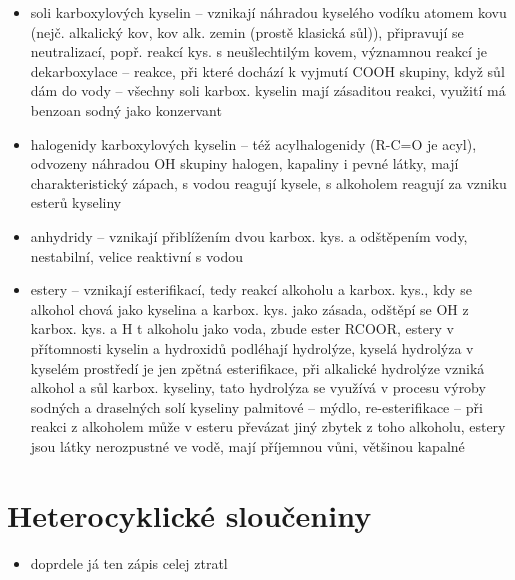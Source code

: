 \documentclass{article}
\begin{document}
\begin{itemize}
  \begin{itemize}
    \item soli karboxylových kyselin -- vznikají náhradou kyselého vodíku atomem kovu (nejč. alkalický kov, kov alk. zemin (prostě klasická sůl)), připravují se neutralizací, popř. reakcí kys. s neušlechtilým kovem, významnou reakcí je dekarboxylace -- reakce, při které dochází k vyjmutí COOH skupiny, když sůl dám do vody -- všechny soli karbox. kyselin mají zásaditou reakci, využití má benzoan sodný jako konzervant
    \item halogenidy karboxylových kyselin -- též acylhalogenidy (R-C=O je acyl), odvozeny náhradou OH skupiny halogen, kapaliny i pevné látky, mají charakteristický zápach, s vodou reagují kysele, s alkoholem reagují za vzniku esterů kyseliny
    \item anhydridy -- vznikají přiblížením dvou karbox. kys. a odštěpením vody, nestabilní, velice reaktivní s vodou
    \item estery -- vznikají esterifikací, tedy reakcí alkoholu a karbox. kys., kdy se alkohol chová jako kyselina a karbox. kys. jako zásada, odštěpí se OH z karbox. kys. a H t alkoholu jako voda, zbude ester RCOOR, estery v přítomnosti kyselin a hydroxidů podléhají hydrolýze, kyselá hydrolýza v kyselém prostředí je jen zpětná esterifikace, při alkalické hydrolýze vzniká alkohol a sůl karbox. kyseliny, tato hydrolýza se využívá v procesu výroby sodných a draselných solí kyseliny palmitové -- mýdlo, re-esterifikace -- při reakci z alkoholem může v esteru převázat jiný zbytek z toho alkoholu, estery jsou látky nerozpustné ve vodě, mají příjemnou vůni, většinou kapalné
  \end{itemize}
\end{itemize}

\part{Heterocyklické sloučeniny}
\begin{itemize}
  \item doprdele já ten zápis celej ztratl
\end{itemize}
\end{document}
